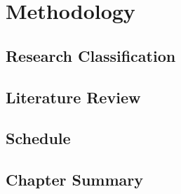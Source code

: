 \chapter[Methodology]{Methodology}

\section{Research Classification}

\section{Literature Review}

\section{Schedule}

\section{Chapter Summary}